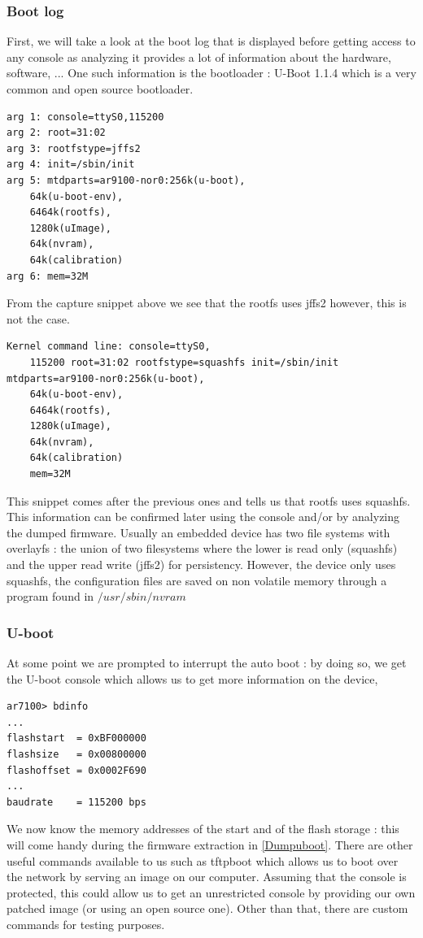 \documentclass{article}
\begin{document}
\subsubsection{Boot log}
First, we will take a look at the boot log that is displayed before getting access to any console as analyzing it provides a lot of information about the hardware, software, ... One such information is the bootloader : U-Boot 1.1.4 which is a very common and open source bootloader. 
\begin{lstlisting}
arg 1: console=ttyS0,115200
arg 2: root=31:02
arg 3: rootfstype=jffs2
arg 4: init=/sbin/init
arg 5: mtdparts=ar9100-nor0:256k(u-boot),
	64k(u-boot-env),
	6464k(rootfs),
	1280k(uImage),
	64k(nvram),
	64k(calibration)
arg 6: mem=32M
\end{lstlisting}
From the capture snippet above we see that the rootfs uses jffs2 however, this is not the case.
\begin{lstlisting}
Kernel command line: console=ttyS0,
	115200 root=31:02 rootfstype=squashfs init=/sbin/init mtdparts=ar9100-nor0:256k(u-boot),
	64k(u-boot-env),
	6464k(rootfs),
	1280k(uImage),
	64k(nvram),
	64k(calibration) 
	mem=32M 	
\end{lstlisting}
This snippet comes after the previous ones and tells us that rootfs uses squashfs. This information can be confirmed later using the console and/or by analyzing the dumped firmware. Usually an embedded device has two file systems with overlayfs : the union of two filesystems where the lower is read only (squashfs) and the upper read write (jffs2) for persistency. However, the device only uses squashfs, the configuration files are saved on non volatile memory through a program found in $/usr/sbin/nvram$
\subsubsection{U-boot}\label{ubootinfo}
At some point we are prompted to interrupt the auto boot : by doing so, we get the U-boot console which allows us to get more information on the device,
\begin{lstlisting}
ar7100> bdinfo
...
flashstart  = 0xBF000000
flashsize   = 0x00800000
flashoffset = 0x0002F690
...
baudrate    = 115200 bps	
\end{lstlisting}
We now know the memory addresses of the start and of the flash storage : this will come handy during the firmware extraction in \ref{Dumpuboot}. There are other useful commands available to us such as tftpboot which allows us to boot over the network by serving an image on our computer. Assuming that the console is protected, this could allow us to get an unrestricted console by providing our own patched image (or using an open source one). Other than that, there are custom commands for testing purposes.
\end{document}
